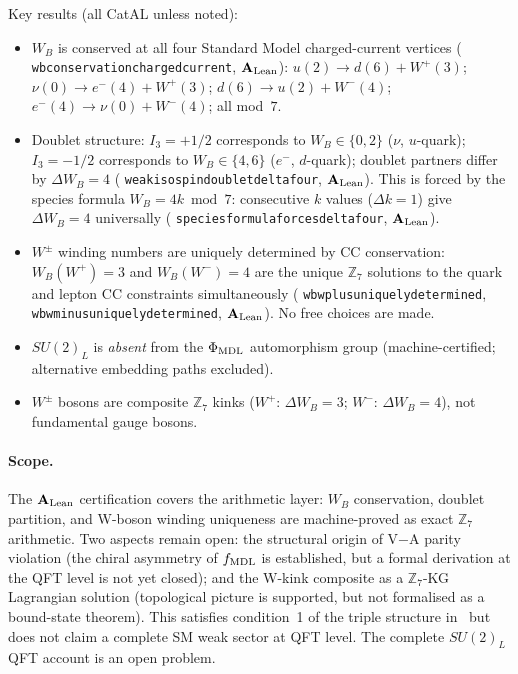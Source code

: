 \documentclass[11pt]{article}
\theoremstyle{remark}
\newcommand{\ZS}{\mathbb{Z}_7}
\newcommand{\phimdl}{\Phi_{\rm MDL}}
\newcommand{\lean}[1]{%
  \penalty-100
  \begingroup\def\_{\textunderscore\allowbreak}\texttt{#1}\endgroup}
\newcommand{\CatAL}{\ensuremath{\textbf{A}_{\rm Lean}}}
\begin{document}
Key results (all CatAL unless noted):

\begin{itemize}[leftmargin=2em]
\item $W_B$ is conserved at all four Standard Model charged-current vertices
  (\lean{wb\_conservation\_charged\_current}, $\CatAL$):
  $u(2)\to d(6){+}W^+(3)$; $\nu(0)\to e^-(4){+}W^+(3)$;
  $d(6)\to u(2){+}W^-(4)$; $e^-(4)\to \nu(0){+}W^-(4)$;
  all mod~$7$.
\item Doublet structure: $I_3 = +1/2$ corresponds to $W_B \in \{0,2\}$
  ($\nu$, $u$-quark); $I_3 = -1/2$ corresponds to $W_B \in \{4,6\}$
  ($e^-$, $d$-quark); doublet partners differ by
  $\Delta W_B = 4$ (\lean{weak\_isospin\_doublet\_delta\_four}, $\CatAL$).
  This is forced by the species formula $W_B = 4k \bmod 7$:
  consecutive $k$ values ($\Delta k = 1$) give $\Delta W_B = 4$ universally
  (\lean{species\_formula\_forces\_delta\_four}, $\CatAL$).
\item $W^\pm$ winding numbers are uniquely determined by CC conservation:
  $W_B(W^+) = 3$ and $W_B(W^-) = 4$ are the unique $\ZS$ solutions to
  the quark and lepton CC constraints simultaneously
  (\lean{wb\_wplus\_uniquely\_determined}, \lean{wb\_wminus\_uniquely\_determined},
  $\CatAL$). No free choices are made.
\item $SU(2)_L$ is \emph{absent} from the $\phimdl$ automorphism group
  (machine-certified; alternative embedding paths excluded).
\item $W^\pm$ bosons are composite $\ZS$ kinks ($W^+$: $\Delta W_B = 3$;
  $W^-$: $\Delta W_B = 4$), not fundamental gauge bosons.
\end{itemize}

\paragraph{Scope.}
The $\CatAL$ certification covers the arithmetic layer: $W_B$ conservation,
doublet partition, and W-boson winding uniqueness are machine-proved as exact
$\ZS$ arithmetic.
Two aspects remain open: the structural origin of V$-$A parity violation
(the chiral asymmetry of $f_{\rm MDL}$ is established, but a formal derivation
at the QFT level is not yet closed); and the W-kink composite as a
$\ZS$-KG Lagrangian solution (topological picture is supported, but not
formalised as a bound-state theorem).
This satisfies condition~1 of the triple structure in~\cite{SpivackGTEUnification}
but does not claim a complete SM weak sector at QFT level.
The complete $SU(2)_L$ QFT account is an open problem.
\end{document}
